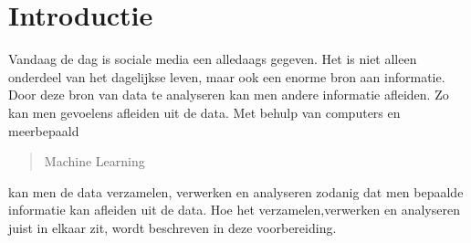 \section{Introductie}\label{introductie}
Vandaag de dag is sociale media een alledaags gegeven. Het is niet alleen onderdeel van het dagelijkse leven, maar ook een enorme bron aan informatie.
Door deze bron van data te analyseren kan men andere informatie afleiden. Zo kan men gevoelens afleiden uit de data. Met behulp van computers en meerbepaald \begin{quote}Machine Learning\end{quote} kan men de data verzamelen, verwerken en analyseren zodanig dat men bepaalde informatie kan afleiden uit de data.
Hoe het verzamelen,verwerken en analyseren juist in elkaar zit, wordt beschreven in deze voorbereiding.
